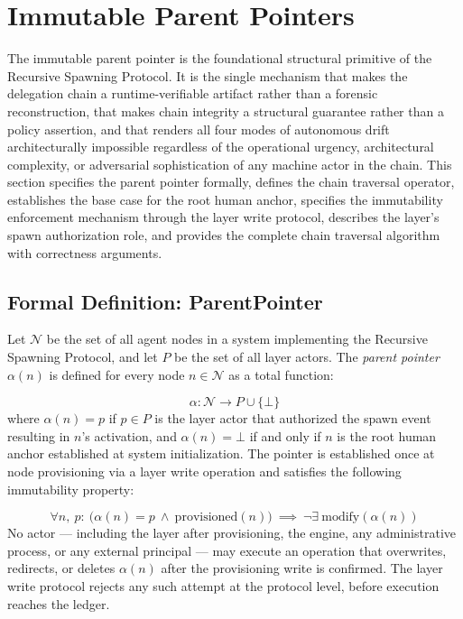 \section{Immutable Parent Pointers}
\label{sec:immutable-parent-pointers}

The immutable parent pointer is the foundational structural primitive of the Recursive Spawning Protocol. It is the single mechanism that makes the delegation chain a runtime-verifiable artifact rather than a forensic reconstruction, that makes chain integrity a structural guarantee rather than a policy assertion, and that renders all four modes of autonomous drift architecturally impossible regardless of the operational urgency, architectural complexity, or adversarial sophistication of any machine actor in the chain. This section specifies the parent pointer formally, defines the chain traversal operator, establishes the base case for the root human anchor, specifies the immutability enforcement mechanism through the \fact{} layer write protocol, describes the \purpose{} layer's spawn authorization role, and provides the complete chain traversal algorithm with correctness arguments.

\subsection{Formal Definition: ParentPointer}
\label{sec:parent-pointer-definition}

Let $\mathcal{N}$ be the set of all agent nodes in a \bxthree{} system implementing the Recursive Spawning Protocol, and let $P$ be the set of all \purpose{} layer actors. The \emph{parent pointer} $\alpha(n)$ is defined for every node $n \in \mathcal{N}$ as a total function:

\begin{dfn}
\label{dfn:parent-pointer}
\begin{equation}
\alpha : \mathcal{N} \rightarrow P \cup \{\bot\}
\end{equation}
where $\alpha(n) = p$ if $p \in P$ is the \purpose{} layer actor that authorized the spawn event resulting in $n$'s activation, and $\alpha(n) = \bot$ if and only if $n$ is the root human anchor established at system initialization. The pointer is established once at node provisioning via a \fact{} layer write operation and satisfies the following immutability property:

\begin{equation}
\forall n,\ p:\ \bigl(\alpha(n) = p \ \land \ \text{provisioned}(n)\bigr) \ \implies \ \neg\exists\ \text{modify}(\alpha(n))
\label{eq:parent-pointer-immutability}
\end{equation}
No actor --- including the \purpose{} layer after provisioning, the \bounds{} engine, any administrative process, or any external principal --- may execute an operation that overwrites, redirects, or deletes $\alpha(n)$ after the provisioning write is confirmed. The \fact{} layer write protocol rejects any such attempt at the protocol level, before execution reaches the ledger.
\end{dfn}

